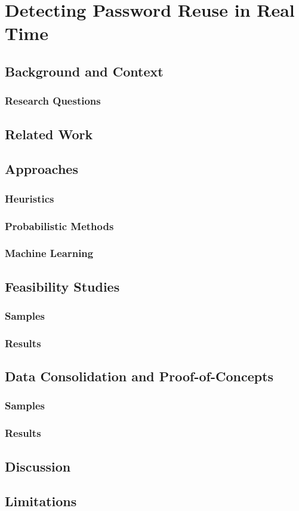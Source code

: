\chapter[Detecting Password Reuse in Real Time]{Detecting Password Reuse in Real Time}

\section{Background and Context}

\subsection{Research Questions}

\section{Related Work}

\section{Approaches}
\subsection{Heuristics}
\subsection{Probabilistic Methods}
\subsection{Machine Learning}


\section{Feasibility Studies}

\subsection{Samples}
\subsection{Results}

\section{Data Consolidation and Proof-of-Concepts}


\subsection{Samples}
\subsection{Results}

\section{Discussion}



\section{Limitations}

